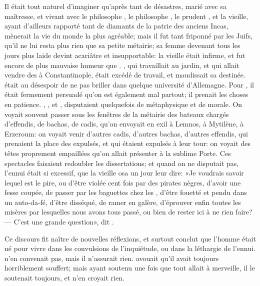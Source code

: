 Il était tout naturel d’imaginer qu’après tant de désastres, 
marié avec sa maîtresse, et vivant avec le philosophe , le
philosophe , le prudent , et la vieille, ayant d’ailleurs
rapporté tant de diamants de la patrie des anciens Incas, mènerait la
vie du monde la plus agréable; mais il fut tant friponné par les Juifs,
qu’il ne lui resta plus rien que sa petite métairie; sa femme devenant
tous les jours plus laide devint acariâtre et insupportable: la vieille
était infirme, et fut encore de plus mauvaise humeur que .
, qui travaillait au jardin, et qui allait vendre des  à
Constantinople, était excédé de travail, et maudissait sa destinée.
 était au désespoir de ne pas briller dans quelque université
d’Allemagne. Pour , il était fermement persuadé qu’on est
également mal partout; il prenait les choses en patience. ,
, et , disputaient quelquefois de métaphysique et de
morale. On voyait souvent passer sous les fenêtres de la métairie des
bateaux chargés d’effendis, de bachas, de cadis, qu’on envoyait en exil
à Lemnos, à Mytilène, à Erzeroum: on voyait venir d’autres cadis,
d’autres bachas, d’autres effendis, qui prenaient la place des
expulsés, et qui étaient expulsés à leur tour: on voyait des têtes
proprement empaillées qu’on allait présenter à la sublime Porte. Ces
spectacles faisaient redoubler les dissertations; et quand on ne
disputait pas, l’ennui était si excessif, que la vieille osa un jour
leur dire: «Je voudrais savoir lequel est le pire, ou d’être violée cent
fois par des pirates nègres, d’avoir une fesse coupée, de passer par
les baguettes chez les , d’être fouetté et pendu dans un
auto-da-fé, d’être disséqué, de ramer en galère, d’éprouver enfin
toutes les misères par lesquelles nous avons tous passé, ou bien de
rester ici à ne rien faire? — C’est une grande question», dit .






Ce discours fit naître de nouvelles réflexions, et  surtout
conclut que l’homme était né pour vivre dans les convulsions de
l’inquiétude, ou dans la léthargie de l’ennui.  n’en convenait
pas, mais il n’assurait rien.  avouait qu’il avait toujours
horriblement souffert; mais ayant soutenu une fois que tout allait à
merveille, il le soutenait toujours, et n’en croyait rien.

